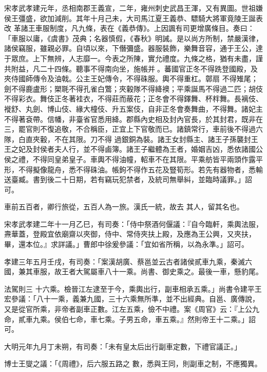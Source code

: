 \begin{pinyinscope}
 宋孝武孝建元年，丞相南郡王義宣，二年，雍州刺史武昌王渾，又有異圖。世祖嫌侯王彊盛，欲加減削。其年十月己未，大司馬江夏王義恭、驃騎大將軍竟陵王誕表改
 革諸王車服制度，凡九條，表在《義恭傳》。上因諷有司更增廣條目。奏曰：「車服以庸，《虞書》茂典；名器慎假，《春秋》明誡。是以尚方所制，禁嚴漢律，諸侯竊服，雖親必罪。自頃以來，下僭彌盛。器服裝飾，樂舞音容，通于王公，達于眾庶。上下無辨，人志靡一。今表之所陳，實允禮度。九條之格，猶有未盡，謹共附益，凡二十四條。聽事不得南向坐，施帳并𢃕。蕃國官正冬不得跣登國殿，及夾侍國師傳令及油戟。公主王妃傳令，不得硃服。輿不得重杠。鄣扇
 不得雉尾；劍不得鹿盧形；槊毦不得孔雀白鷩；夾轂隊不得絳襖；平乘誕馬不得過二匹；胡伎不得彩衣。舞伎正冬著袿衣，不得莊而蔽花；正冬會不得鐸舞、杯柈舞。長褵伎、褷舒、丸劍、博山伎、緣大橦伎、升五案伎，自非正冬會奏舞曲，不得舞。諸妃主不得著袞帶。信幡，非臺省官悉用絳。郡縣內史相及封內官長，於其封君，既非在三，罷官則不復追敬，不合稱臣，正宜上下官敬而已。諸鎮常行，車前後不得過六隊，白直夾轂，不在其限。刀不得
 過銀銅為裝。諸王女封縣主、諸王子孫襲封王王之妃及封侯者夫人行，並不得鹵簿。諸王子繼體為王者，婚姻吉凶，悉依諸國公侯之禮，不得同皇弟皇子。車輿不得油幢，軺車不在其限。平乘舫皆平兩頭作露平形，不得擬像龍舟，悉不得硃油。帳鉤不得作五花及豎筍形。若先有器物者，悉輸送臺臧。書到後二十日期，若有竊玩犯禁者，及統司無舉糾，並臨時議罪。」詔可。



 車前五百者，卿行旅從，五百人為一旅。漢氏一統，故去
 其人，留其名也。



 宋孝武孝建二年十一月乙巳，有司奏：「侍中祭酒何偃議：『自今臨軒，乘輿法服，燾華蓋，登殿宜依廟齋以夾御，侍中、常侍夾扶上殿，及應為王公興，又夾扶，畢，還本位。』求詳議。」曹郎中徐爰參議：「宜如省所稱，以為永準。」詔可。



 孝建三年五月壬戌，有司奏：「案漢胡廣、蔡邕並云古者諸侯貳車九乘，秦滅六國，兼其車服，故王者大駕屬車八十一乘。尚書、御史乘之。最後一車，懸豹尾。



 法駕則三
 十六乘。檢晉江左逮至于今，乘輿出行，副車相承五乘。」尚書令建平王宏參議：「八十一乘，義兼九國，三十六乘無所準，並不出經典。自邕、廣傳說，又是從官所乘，非帝者副車正數。江左五乘，儉不中禮。案《周官》云：『上公九命，貳車九乘。侯伯七命，車七乘。子男五命，車五乘。』然則帝王十二乘。」詔可。



 大明元年九月丁未朔，有司奏：「未有皇太后出行副車定數，下禮官議正。」



 博士王燮之議：「《周禮》，后六服五路之
 數，悉與王同，則副車之制，不應獨異。




\end{pinyinscope}
